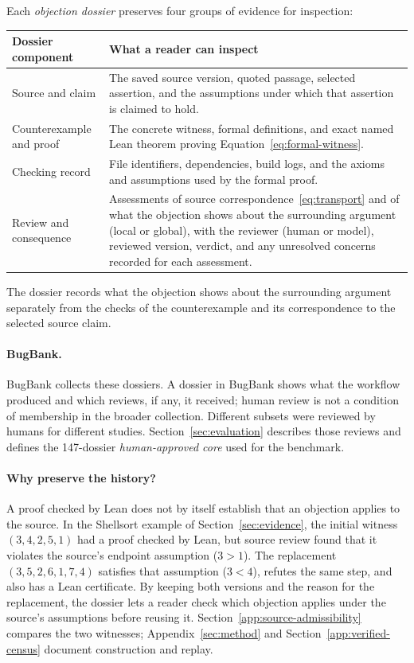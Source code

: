 \noindent\begin{minipage}{\linewidth}
Each \emph{objection dossier} preserves four groups of evidence for inspection:

{\small\noindent
\begin{tabularx}{\linewidth}{@{}p{.27\linewidth}X@{}}
\toprule
Dossier component & What a reader can inspect\\\midrule
Source and claim & The saved source version, quoted passage, selected assertion, and the assumptions under which that assertion is claimed to hold.\\
Counterexample and proof & The concrete witness, formal definitions, and exact named Lean theorem proving Equation~\eqref{eq:formal-witness}.\\
Checking record & File identifiers, dependencies, build logs, and the axioms and assumptions used by the formal proof.\\
Review and consequence & Assessments of source correspondence~\eqref{eq:transport} and of what the objection shows about the surrounding argument (local or global), with the reviewer (human or model), reviewed version, verdict, and any unresolved concerns recorded for each assessment.\\
\bottomrule
\end{tabularx}\par}
\end{minipage}
The dossier records what the objection shows about the surrounding argument separately from the checks of the counterexample and its correspondence to the selected source claim.

\paragraph{BugBank.}
BugBank collects these dossiers. A dossier in BugBank shows what the workflow produced and which reviews, if any, it received; human review is not a condition of membership in the broader collection. Different subsets were reviewed by humans for different studies. Section~\ref{sec:evaluation} describes those reviews and defines the 147-dossier \emph{human-approved core} used for the benchmark.

\paragraph{Why preserve the history?}
A proof checked by Lean does not by itself establish that an objection applies to the source. In the Shellsort example of Section~\ref{sec:evidence}, the initial witness $(3,4,2,5,1)$ had a proof checked by Lean, but source review found that it violates the source's endpoint assumption ($3>1$). The replacement $(3,5,2,6,1,7,4)$ satisfies that assumption ($3<4$), refutes the same step, and also has a Lean certificate. By keeping both versions and the reason for the replacement, the dossier lets a reader check which objection applies under the source's assumptions before reusing it. Section~\ref{app:source-admissibility} compares the two witnesses; Appendix~\ref{sec:method} and Section~\ref{app:verified-census} document construction and replay.
